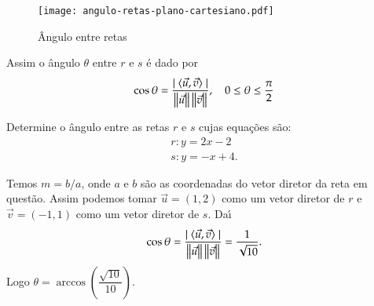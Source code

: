 \begin{figure}[!h]
  \centering
  \caption{\^Angulo entre retas}
  \texttt{[image: angulo-retas-plano-cartesiano.pdf]}



\end{figure}

Assim o \^angulo $\theta$ entre $r$ e $s$ \'e dado por
\[
  \cos\theta = \dfrac{\mid\langle \vec{u}, \vec{v} \rangle\mid}{\left\Vert{\vec{u}}\right\Vert\left\Vert{\vec{v}}\right\Vert},\quad 0 \le \theta \le \dfrac{\pi}{2}
\]

\begin{exemplos}
  Determine o \^angulo entre as retas $r$ e $s$ cujas equa\c{c}\~oes s\~ao:
  \begin{align*}
    r: y = 2x -2\\
    s: y = -x + 4.
  \end{align*}
  \begin{solucao}
    Temos $m = b/a$, onde $a$ e $b$ s\~ao as coordenadas do vetor diretor da reta em quest\~ao. Assim podemos tomar $\vec{u} = (1,2)$ como um vetor diretor de $r$ e $\vec{v} = (-1,1)$ como um vetor diretor de $s$. Da{\'\i}
    \[
      \cos\theta = \dfrac{\mid\langle \vec{u}, \vec{v} \rangle\mid}{\left\Vert{\vec{u}}\right\Vert\left\Vert{\vec{v}}\right\Vert} = \dfrac{1}{\sqrt{10}}.
    \]
    Logo $\theta = \arccos\left(\dfrac{\sqrt{10}}{10}\right)$.
  \end{solucao}
\end{exemplos}

